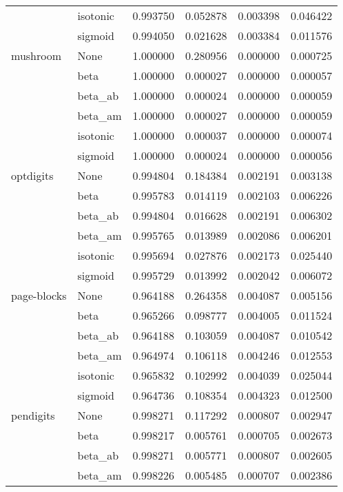 \begin{tabular}{llrrrr}
        & isotonic &  0.993750 &  0.052878 &  0.003398 &  0.046422 \\
        & sigmoid &  0.994050 &  0.021628 &  0.003384 &  0.011576 \\
mushroom & None &  1.000000 &  0.280956 &  0.000000 &  0.000725 \\
        & beta &  1.000000 &  0.000027 &  0.000000 &  0.000057 \\
        & beta\_ab &  1.000000 &  0.000024 &  0.000000 &  0.000059 \\
        & beta\_am &  1.000000 &  0.000027 &  0.000000 &  0.000059 \\
        & isotonic &  1.000000 &  0.000037 &  0.000000 &  0.000074 \\
        & sigmoid &  1.000000 &  0.000024 &  0.000000 &  0.000056 \\
optdigits & None &  0.994804 &  0.184384 &  0.002191 &  0.003138 \\
        & beta &  0.995783 &  0.014119 &  0.002103 &  0.006226 \\
        & beta\_ab &  0.994804 &  0.016628 &  0.002191 &  0.006302 \\
        & beta\_am &  0.995765 &  0.013989 &  0.002086 &  0.006201 \\
        & isotonic &  0.995694 &  0.027876 &  0.002173 &  0.025440 \\
        & sigmoid &  0.995729 &  0.013992 &  0.002042 &  0.006072 \\
page-blocks & None &  0.964188 &  0.264358 &  0.004087 &  0.005156 \\
        & beta &  0.965266 &  0.098777 &  0.004005 &  0.011524 \\
        & beta\_ab &  0.964188 &  0.103059 &  0.004087 &  0.010542 \\
        & beta\_am &  0.964974 &  0.106118 &  0.004246 &  0.012553 \\
        & isotonic &  0.965832 &  0.102992 &  0.004039 &  0.025044 \\
        & sigmoid &  0.964736 &  0.108354 &  0.004323 &  0.012500 \\
pendigits & None &  0.998271 &  0.117292 &  0.000807 &  0.002947 \\
        & beta &  0.998217 &  0.005761 &  0.000705 &  0.002673 \\
        & beta\_ab &  0.998271 &  0.005771 &  0.000807 &  0.002605 \\
        & beta\_am &  0.998226 &  0.005485 &  0.000707 &  0.002386 \\

\end{tabular}
